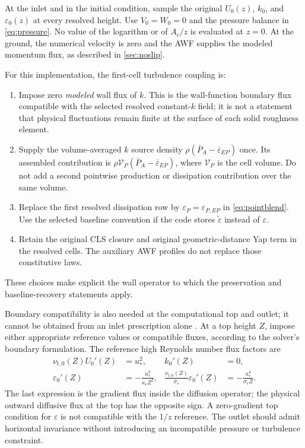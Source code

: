 \documentclass[11pt,a4paper]{article}
\numberwithin{equation}{section}
\newcommand{\eps}{\varepsilon}
\newcommand{\et}{\widetilde{\varepsilon}}
\newcommand{\ust}{u_*}
\newcommand{\kc}{\kappa_c}
\newcommand{\avg}[1]{\overline{#1}}
\newcommand{\Aref}{A_c}
\begin{document}
At the inlet and in the initial condition, sample the original
$U_0(z)$, $k_0$, and $\eps_0(z)$ at every resolved height.
Use $V_0=W_0=0$ and the pressure balance in \cref{eq:pressure}.
No value of the logarithm or of $\Aref/z$ is evaluated at $z=0$.
At the ground, the numerical velocity is zero and the AWF supplies the
modeled momentum flux, as described in \cref{sec:noslip}.

For this implementation, the first-cell turbulence coupling is:
\begin{enumerate}
\item Impose zero \emph{modeled} wall flux of $k$. This is the
wall-function boundary flux compatible with the selected resolved
constant-$k$ field; it is not a statement that physical fluctuations
remain finite at the surface of each solid roughness element.
\item Supply the volume-averaged $k$ source density
$\rho(\avg P_A-\avg\eps_{EP})$ once. Its assembled contribution is
$\rho\mathcal V_P(\avg P_A-\avg\eps_{EP})$, where $\mathcal V_P$
is the cell volume. Do not add a second pointwise production or
dissipation contribution over the same volume.
\item Replace the first resolved dissipation row by
$\eps_P=\eps_{P,EP}$ in \cref{eq:pointblend}. Use the selected
baseline convention if the code stores $\et$ instead of $\eps$.
\item Retain the original CLS closure and original geometric-distance
Yap term in the resolved cells. The auxiliary AWF profiles do not
replace those constitutive laws.
\end{enumerate}
These choices make explicit the wall operator to which the preservation
and baseline-recovery statements apply.

Boundary compatibility is also needed at the computational top and
outlet; it cannot be obtained from an inlet prescription alone
\cite{RichardsHoxey1993,RichardsNorris2011}.
At a top height $Z$, impose either appropriate reference values or
compatible fluxes, according to the solver's boundary formulation.
The reference high Reynolds number flux factors are
\begin{equation}
\begin{aligned}
 \nu_{t,0}(Z)U_0'(Z)&=\ust^2,&
 k_0'(Z)&=0,\\
 \eps_0'(Z)&=-\frac{\ust^3}{\kc Z^2},&
 \frac{\nu_{t,0}(Z)}{\sigma_\eps}\eps_0'(Z)
 &=-\frac{\ust^4}{\sigma_\eps Z}.
\end{aligned}
\label{eq:topflux}
\end{equation}
The last expression is the gradient flux inside the diffusion operator;
the physical outward diffusive flux at the top has the opposite sign.
A zero-gradient top condition for $\eps$ is not compatible with the
$1/z$ reference. The outlet should admit horizontal invariance without
introducing an incompatible pressure or turbulence constraint.
\end{document}
